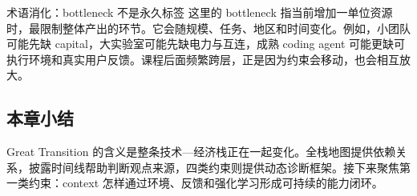 \begin{knowledgebox}{术语消化：bottleneck 不是永久标签}
这里的 bottleneck 指当前增加一单位资源时，最限制整体产出的环节。它会随规模、任务、地区和时间变化。例如，小团队可能先缺 capital，大实验室可能先缺电力与互连，成熟 coding agent 可能更缺可执行环境和真实用户反馈。课程后面频繁跨层，正是因为约束会移动，也会相互放大。
\end{knowledgebox}

\subsection{本章小结}

Great Transition 的含义是整条技术—经济栈正在一起变化。全栈地图提供依赖关系，披露时间线帮助判断观点来源，四类约束则提供动态诊断框架。接下来聚焦第一类约束：context 怎样通过环境、反馈和强化学习形成可持续的能力闭环。

